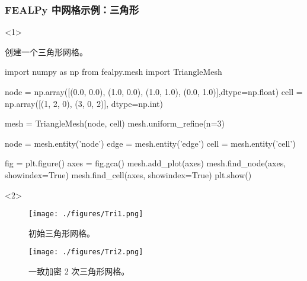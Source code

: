 \documentclass{beamer}
\numberwithin{subsection}{section}
\begin{document}
\begin{frame}[fragile]
    \frametitle{FEALPy 中网格示例：三角形}
\begin{onlyenv}<1>
	\begin{listing}[H]
	 \tiny
     \caption{创建一个三角形网格。}
	 \begin{pythoncode}
import numpy as np
from fealpy.mesh import TriangleMesh

node = np.array([(0.0, 0.0), (1.0, 0.0), (1.0, 1.0), (0.0, 1.0)],dtype=np.float)
cell = np.array([(1, 2, 0), (3, 0, 2)], dtype=np.int)

mesh = TriangleMesh(node, cell)
mesh.uniform_refine(n=3)

node = mesh.entity('node')
edge = mesh.entity('edge')
cell = mesh.entity('cell')

fig = plt.figure()
axes = fig.gca()
mesh.add_plot(axes)
mesh.find_node(axes, showindex=True)
mesh.find_cell(axes, showindex=True)
plt.show()
	 \end{pythoncode}     
	\end{listing}
\end{onlyenv}
\begin{onlyenv}<2>
\begin{figure}[H]
	\begin{minipage}[t]{0.49\linewidth}
	\centering
    \texttt{[image: ./figures/Tri1.png]}
    \caption{初始三角形网格。}
	\end{minipage}
	\hfill
	\begin{minipage}[t]{0.49\linewidth}
	\centering
    \texttt{[image: ./figures/Tri2.png]}
    \caption{一致加密 2 次三角形网格。}
	\end{minipage}	
\end{figure}
\end{onlyenv}
\end{frame}
\end{document}
